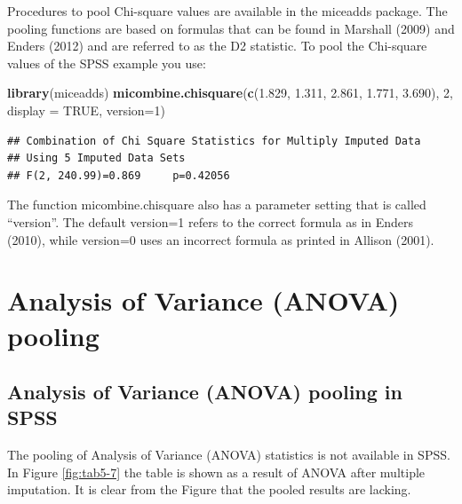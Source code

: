 \documentclass[]{book}
\newenvironment{Shaded}{\begin{snugshade}}{\end{snugshade}}
\newcommand{\KeywordTok}[1]{\textcolor[rgb]{0.13,0.29,0.53}{\textbf{#1}}}
\newcommand{\DataTypeTok}[1]{\textcolor[rgb]{0.13,0.29,0.53}{#1}}
\newcommand{\DecValTok}[1]{\textcolor[rgb]{0.00,0.00,0.81}{#1}}
\newcommand{\FloatTok}[1]{\textcolor[rgb]{0.00,0.00,0.81}{#1}}
\newcommand{\OtherTok}[1]{\textcolor[rgb]{0.56,0.35,0.01}{#1}}
\newcommand{\NormalTok}[1]{#1}
\theoremstyle{definition}
\theoremstyle{definition}
\theoremstyle{definition}
\theoremstyle{remark}
\begin{document}
Procedures to pool Chi-square values are available in the miceadds
package. The pooling functions are based on formulas that can be found
in Marshall (2009) and Enders (2012) and are referred to as the D2
statistic. To pool the Chi-square values of the SPSS example you use:

\begin{Shaded}
\begin{Highlighting}[]
\KeywordTok{library}\NormalTok{(miceadds)}
\KeywordTok{micombine.chisquare}\NormalTok{(}\KeywordTok{c}\NormalTok{(}\FloatTok{1.829}\NormalTok{, }\FloatTok{1.311}\NormalTok{, }\FloatTok{2.861}\NormalTok{, }\FloatTok{1.771}\NormalTok{, }\FloatTok{3.690}\NormalTok{), }\DecValTok{2}\NormalTok{, }\DataTypeTok{display =} \OtherTok{TRUE}\NormalTok{, }\DataTypeTok{version=}\DecValTok{1}\NormalTok{)}
\end{Highlighting}
\end{Shaded}

\begin{verbatim}
## Combination of Chi Square Statistics for Multiply Imputed Data
## Using 5 Imputed Data Sets
## F(2, 240.99)=0.869     p=0.42056
\end{verbatim}

The function micombine.chisquare also has a parameter setting that is
called ``version''. The default version=1 refers to the correct formula
as in Enders (2010), while version=0 uses an incorrect formula as
printed in Allison (2001).

\section{Analysis of Variance (ANOVA)
pooling}\label{analysis-of-variance-anova-pooling}

\subsection{Analysis of Variance (ANOVA) pooling in
SPSS}\label{analysis-of-variance-anova-pooling-in-spss}

The pooling of Analysis of Variance (ANOVA) statistics is not available
in SPSS. In Figure \ref{fig:tab5-7} the table is shown as a result of
ANOVA after multiple imputation. It is clear from the Figure that the
pooled results are lacking.
\end{document}

